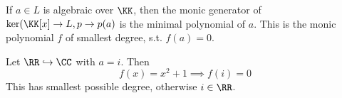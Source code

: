 \begin{definition}
	If \( a\in L \) is algebraic over \( \KK \), then the monic generator of \( \ker(\KK[x] \to L,
	p\to p(a) \) is the minimal polynomial of \( a \). This is the monic polynomial \( f \) of
	smallest degree, s.t. \( f(a) = 0 \).
\end{definition}

\begin{eg}
	Let \( \RR \hookrightarrow \CC \) with \( a = i \). Then
	\[
		f(x) = x^2 + 1 \implies f(i) = 0
	\]
	This has smallest possible degree, otherwise \( i \in \RR \).
\end{eg}
